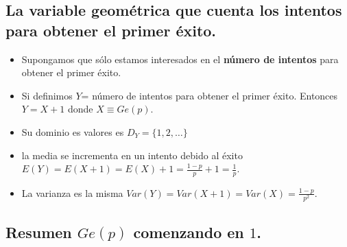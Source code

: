 \documentclass[]{book}
\providecommand{\tightlist}{%
  \setlength{\itemsep}{0pt}\setlength{\parskip}{0pt}}
\begin{document}
\hypertarget{la-variable-geomuxe9trica-que-cuenta-los-intentos-para-obtener-el-primer-uxe9xito.}{%
\subsection{La variable geométrica que cuenta los intentos para obtener el primer éxito.}\label{la-variable-geomuxe9trica-que-cuenta-los-intentos-para-obtener-el-primer-uxe9xito.}}

\begin{itemize}
\tightlist
\item
  Supongamos que sólo estamos interesados en el \textbf{número de intentos} para obtener el primer éxito.
\item
  Si definimos \(Y\)= número de intentos para obtener el primer éxito. Entonces \(Y=X+1\) donde \(X\equiv Ge(p)\).
\item
  Su dominio es valores es \(D_Y=\{1,2,\ldots\}\)
\item
  la media se incrementa en un intento debido al éxito \(E(Y)=E(X+1)=E(X)+1=\frac{1-p}{p}+1=\frac1{p}\).
\item
  La varianza es la misma \(Var(Y)=Var(X+1)=Var(X)=\frac{1-p}{p^2}\).
\end{itemize}

\hypertarget{resumen-gep-comenzando-en-1.}{%
\subsection{\texorpdfstring{Resumen \(Ge(p)\) comenzando en \(1\).}{Resumen Ge(p) comenzando en 1.}}\label{resumen-gep-comenzando-en-1.}}
\end{document}
